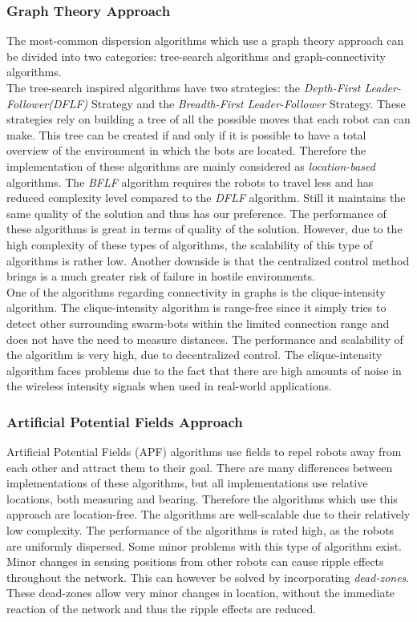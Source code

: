 \subsubsection{Graph Theory Approach}
The most-common dispersion algorithms which use a graph theory approach can be divided into two categories: tree-search algorithms and graph-connectivity algorithms.\\
The tree-search inspired algorithms have two strategies: the \emph{Depth-First Leader-Follower(DFLF)} Strategy and the \emph{Breadth-First Leader-Follower} Strategy. \cite{hsiang2004algorithms} 
These strategies rely on building a tree of all the possible moves that each robot can can make. 
This tree can be created if and only if it is possible to have a total overview of the environment in which the bots are located. 
Therefore the implementation of these algorithms are mainly considered as \emph{location-based} algorithms.
The \emph{BFLF} algorithm requires the robots to travel less and has reduced complexity level compared to the \emph{DFLF} algorithm.
Still it maintains the same quality of the solution and thus has our preference.
The performance of these algorithms is great in terms of quality of the solution.
However, due to the high complexity of these types of algorithms, the scalability of this type of algorithms is rather low.
Another downside is that the centralized control method brings is a much greater risk of failure in hostile environments.\\
One of the algorithms regarding connectivity in graphs is the clique-intensity algorithm. \cite{ugur2007dispersion}
The clique-intensity algorithm is range-free since it simply tries to detect other surrounding swarm-bots within the limited connection range and does not have the need to measure distances. 
The performance and scalability of the algorithm is very high, due to decentralized control.
The clique-intensity algorithm faces problems due to the fact that there are high amounts of noise in the wireless intensity signals when used in real-world applications. 

\subsubsection{Artificial Potential Fields Approach}
Artificial Potential Fields (APF) algorithms use fields to repel robots away from each other and attract them to their goal. \cite{khatib1986real}
There are many differences between implementations of these algorithms, but all implementations use relative locations, both measuring and bearing. 
Therefore the algorithms which use this approach are location-free. \cite{pakanati2010swarm}
The algorithms are well-scalable due to their relatively low complexity.
The performance of the algorithms is rated high, as the robots are uniformly dispersed.
Some minor problems with this type of algorithm exist.
Minor changes in sensing positions from other robots can cause ripple effects throughout the network.
This can however be solved by incorporating \emph{dead-zones}.
These dead-zones allow very minor changes in location, without the immediate reaction of the network and thus the ripple effects are reduced. \cite{pakanati2010swarm}

